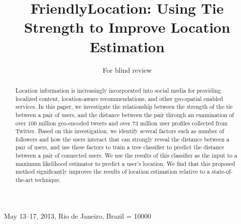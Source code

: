 \documentclass{sig-alternate}
\begin{document}
 {May 13--17, 2013, Rio de Janeiro, Brazil}
\widowpenalty = 10000

\author{
\alignauthor
For blind review
}

\title{FriendlyLocation: Using Tie Strength to Improve Location Estimation}

\maketitle
\begin{abstract}

%
Location information is increasingly incorporated into social media for
providing localized content, location-aware recommendations, and other
geo-spatial enabled services.
%
In this paper, we investigate the relationship between the strength of the tie
between a pair of users, and the distance between the pair through an
examination of over 100 million geo-encoded tweets and
over 73 million user profiles collected from Twitter.
%
Based on this investigation, we identify several factors such as number of
followers and how the users interact that can strongly reveal the distance
between a pair of users, and use these factors to train a tree classifier to
predict the distance between a pair of connected users.
%
We use the results of this classifier as the input to a maximum likelihood
estimator to predict a user's location.
%
We find that this proposed method significantly improves the results of
location estimation relative to a state-of-the-art technique.


\end{abstract}









%


\end{document}
